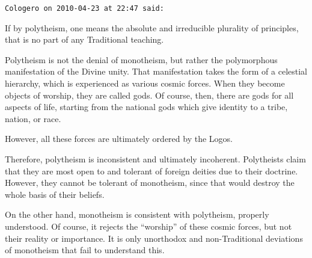 \begin{footnotesize}
\begin{sffamily}

\texttt{Cologero on 2010-04-23 at 22:47 said:}

If by polytheism, one means the absolute and irreducible plurality of principles, that is no part of any Traditional teaching.

Polytheism is not the denial of monotheism, but rather the polymorphous manifestation of the Divine unity. That manifestation takes the form of a celestial hierarchy, which is experienced as various cosmic forces. When they become objects of worship, they are called gods. Of course, then, there are gods for all aspects of life, starting from the national gods which give identity to a tribe, nation, or race.

However, all these forces are ultimately ordered by the Logos.

Therefore, polytheism is inconsistent and ultimately incoherent. Polytheists claim that they are most open to and tolerant of foreign deities due to their doctrine. However, they cannot be tolerant of monotheism, since that would destroy the whole basis of their beliefs.

On the other hand, monotheism is consistent with polytheism, properly understood. Of course, it rejects the ``worship'' of these cosmic forces, but not their reality or importance. It is only unorthodox and non-Traditional deviations of monotheism that fail to understand this.

\end{sffamily}
\end{footnotesize}

